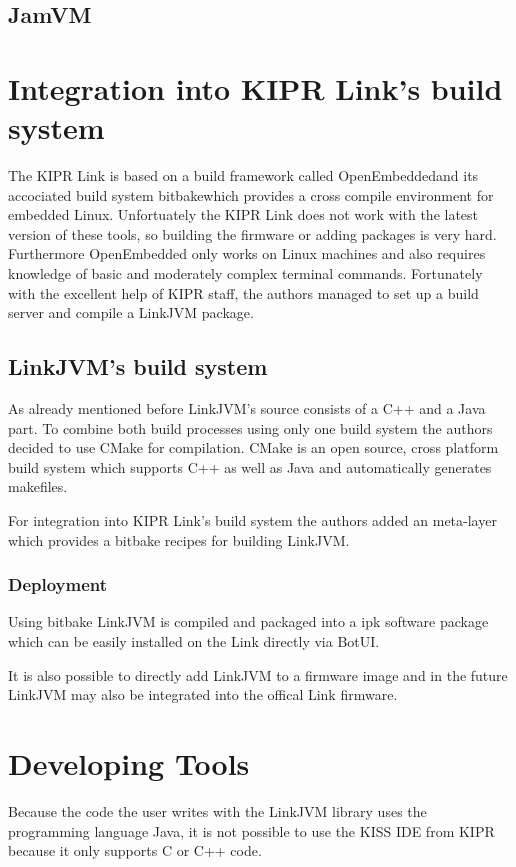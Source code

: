 \documentclass{juniorjournal}
\begin{document}
\subsection{JamVM}

\section{Integration into KIPR Link's build system}
The KIPR Link is based on a build framework called \frqq OpenEmbedded\flqq and its accociated build system \frqq bitbake\flqq  which provides a cross compile environment for embedded Linux.
Unfortuately the KIPR Link does not work with the latest version of these tools, so building the firmware or adding packages is very hard.
Furthermore OpenEmbedded only works on Linux machines and also requires knowledge of basic and moderately complex terminal commands.
Fortunately with the excellent help of KIPR staff, the authors managed to set up a build server and compile a LinkJVM package.

\subsection{LinkJVM's build system}
As already mentioned before LinkJVM's source consists of a C++ and a Java part.
To combine both build processes using only one build system the authors decided to use CMake for compilation.
CMake is an open source, cross platform build system which supports C++ as well as Java and automatically generates makefiles.

For integration into KIPR Link's build system the authors added an meta-layer which provides a bitbake recipes for building LinkJVM.

\subsubsection{Deployment}
Using bitbake LinkJVM is compiled and packaged into a ipk software package which can be easily installed on the Link directly via BotUI.

It is also possible to directly add LinkJVM to a firmware image and in the future LinkJVM may also be integrated into the offical Link firmware.
\section{Developing Tools}
Because the code the user writes with the LinkJVM library uses the programming 
language Java, it is not possible to use the KISS IDE from KIPR because it only 
supports C or C++ code.
\end{document}
